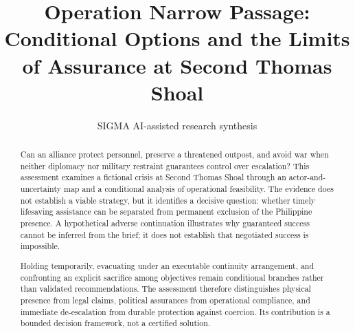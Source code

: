 \documentclass[11pt]{article}
\title{Operation Narrow Passage: Conditional Options and the Limits of Assurance at Second Thomas Shoal}
\date{}
\author{SIGMA AI-assisted research synthesis}
\begin{document}
\maketitle

\begin{abstract}
Can an alliance protect personnel, preserve a threatened outpost, and avoid war when neither diplomacy nor military restraint guarantees control over escalation? This assessment examines a fictional crisis at Second Thomas Shoal through an actor-and-uncertainty map and a conditional analysis of operational feasibility. The evidence does not establish a viable strategy, but it identifies a decisive question: whether timely lifesaving assistance can be separated from permanent exclusion of the Philippine presence. A hypothetical adverse continuation illustrates why guaranteed success cannot be inferred from the brief; it does not establish that negotiated success is impossible.

Holding temporarily, evacuating under an executable continuity arrangement, and confronting an explicit sacrifice among objectives remain conditional branches rather than validated recommendations. The assessment therefore distinguishes physical presence from legal claims, political assurances from operational compliance, and immediate de-escalation from durable protection against coercion. Its contribution is a bounded decision framework, not a certified solution.
\end{abstract}
\begingroup\setlength{\fboxsep}{10pt}
\noindent{}\endgroup\par\medskip
\end{document}
